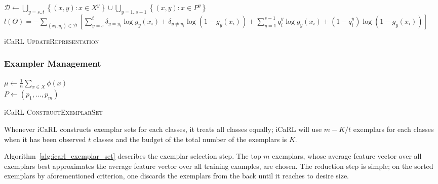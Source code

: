 \begin{algorithm}[ht]

  $\mathcal{D} \leftarrow \bigcup\limits_{y=s..t}\left\{ (x,y) : x \in X^y \right\} \cup \bigcup\limits_{y=1..s-1}\left\{ (x,y) : x \in P^y \right\} $  \\
$l(\Theta) = - \sum\limits_{\left(x_i,y_i\right) \in \mathcal{D}} \left[ \sum\limits_{y=s}^t \delta_{y=y_i}\log g_y(x_i) + \delta_{y\neq y_i}\log \left(1-g_y(x_i)\right) + \sum\limits_{y=1}^{s-1} q_{i}^y\log g_y(x_i) + (1-q_i^y)\log \left(1-g_y(x_i)\right) \right]$ 

\caption{ iCaRL \textsc{UpdateRepresentation} \label{alg:icarl_update}}
\end{algorithm}

\subsubsection{Exampler Management}
\label{sec:icarl_exemplar}

\begin{algorithm}[ht]

  $\mu \leftarrow \frac{1}{n}\sum\limits_{x\in X} \phi(x)$  \\
  $P \leftarrow (p_1, ..., p_m)$

\caption {iCaRL \textsc{ConstructExemplarSet} \label{alg:icarl_exemplar_set}}
\end{algorithm}

Whenever iCaRL constructs exemplar sets for each classes, it treats all classes equally; iCaRL will use $m - K/t$ exemplars for each classes when it has been observed $t$ classes and the budget of the total number of the exemplars is $K$.

Algorithm~\ref{alg:icarl_exemplar_set} describes the exemplar selection step. The top $m$ exemplars, whose average feature vector over all exemplars best approximates the average feature vector over all training examples, are chosen. The reduction step is simple; on the sorted exemplars by aforementioned criterion, one discards the exemplars from the back until it reaches to desire size.


